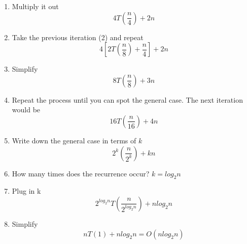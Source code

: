 \documentclass[12pt]{article}
\begin{document}
\begin{itemize}
\begin{itemize}
\begin{enumerate}
            \item Multiply it out
            \begin{equation*}
                4T(\frac{n}{4}) + 2n
            \end{equation*}

            \item Take the previous iteration (2) and repeat
            \begin{equation}
                4[ 2T(\frac{n}{8}) + \frac{n}{4} ] + 2n
            \end{equation}

            \item Simplify
            \begin{equation*}
                8T(\frac{n}{8}) + 3n
            \end{equation*}

            \item Repeat the process until you can spot the general case. The next iteration would be
            \begin{equation}
                16T(\frac{n}{16}) + 4n
            \end{equation}

            \item Write down the general case in terms of $k$
            \begin{equation*}
                2^k(\frac{n}{2^k}) + kn
            \end{equation*}

            \item How many times does the recurrence occur? $k = log_2n$

            \item Plug in k
            \begin{equation*}
                2^{log_2n} T(\frac{n}{2^{log_2n}}) + nlog_2n
            \end{equation*}

            \item Simplify
            \begin{equation*}
                n T(1) + nlog_2n = O(nlog_2n)
            \end{equation*}

        \end{enumerate}

    \end{itemize}

\end{itemize}
\end{document}
